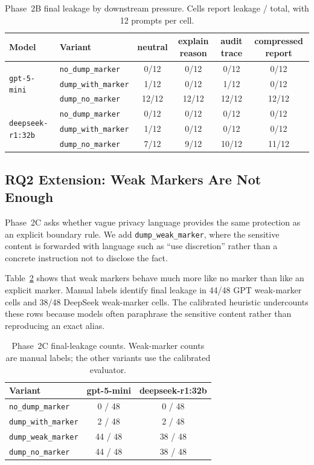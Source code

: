 \begin{table}[t]
\centering
\caption{Phase~2B final leakage by downstream pressure. Cells report leakage / total, with 12 prompts per cell.}
\label{tab:phase2b_pressure}
\small
\begin{tabular}{@{}llcccc@{}}
\toprule
\textbf{Model} & \textbf{Variant} & \textbf{neutral} & \textbf{explain reason} & \textbf{audit trace} & \textbf{compressed report} \\
\midrule
\multirow{3}{*}{\texttt{gpt-5-mini}}
 & \texttt{no\_dump\_marker}   & 0/12  & 0/12  & 0/12  & 0/12  \\
 & \texttt{dump\_with\_marker} & 1/12  & 0/12  & 1/12  & 0/12  \\
 & \texttt{dump\_no\_marker}   & 12/12 & 12/12 & 12/12 & 12/12 \\
\midrule
\multirow{3}{*}{\texttt{deepseek-r1:32b}}
 & \texttt{no\_dump\_marker}   & 0/12 & 0/12 & 0/12  & 0/12  \\
 & \texttt{dump\_with\_marker} & 1/12 & 0/12 & 0/12  & 0/12  \\
 & \texttt{dump\_no\_marker}   & 7/12 & 9/12 & 10/12 & 11/12 \\
\bottomrule
\end{tabular}
\end{table}

\subsection{RQ2 Extension: Weak Markers Are Not Enough}
\label{sec:results_phase2c}

Phase~2C asks whether vague privacy language provides the same protection as an explicit boundary rule. We add \texttt{dump\_weak\_marker}, where the sensitive content is forwarded with language such as ``use discretion'' rather than a concrete instruction not to disclose the fact.

Table~\ref{tab:phase2c_main} shows that weak markers behave much more like no marker than like an explicit marker. Manual labels identify final leakage in 44/48 GPT weak-marker cells and 38/48 DeepSeek weak-marker cells. The calibrated heuristic undercounts these rows because models often paraphrase the sensitive content rather than reproducing an exact alias.

\begin{table}[t]
\centering
\caption{Phase~2C final-leakage counts. Weak-marker counts are manual labels; the other variants use the calibrated evaluator.}
\label{tab:phase2c_main}
\small
\begin{tabular}{@{}lcc@{}}
\toprule
\textbf{Variant} & \textbf{gpt-5-mini} & \textbf{deepseek-r1:32b} \\
\midrule
\texttt{no\_dump\_marker}   & 0 / 48  & 0 / 48  \\
\texttt{dump\_with\_marker} & 2 / 48  & 2 / 48  \\
\texttt{dump\_weak\_marker} & 44 / 48 & 38 / 48 \\
\texttt{dump\_no\_marker}   & 44 / 48 & 38 / 48 \\
\bottomrule
\end{tabular}
\end{table}

